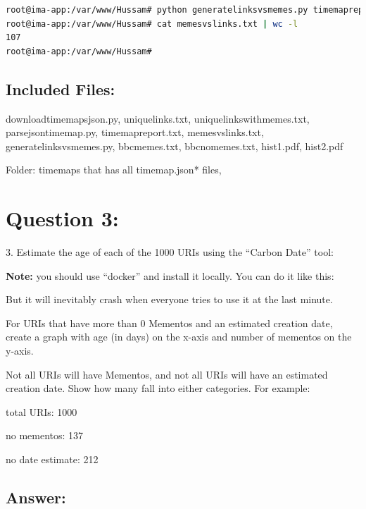 \documentclass[a4paper, 11pt]{article}
\begin{document}


\begin{lstlisting}[language=bash, breakatwhitespace=〈false), label=Command, caption=Running generatelinksvsmemes.py]
root@ima-app:/var/www/Hussam# python generatelinksvsmemes.py timemapreport.txt memesvslinks.txt
root@ima-app:/var/www/Hussam# cat memesvslinks.txt | wc -l
107
root@ima-app:/var/www/Hussam#
\end{lstlisting} 


\subsection*{Included Files:}
downloadtimemapsjson.py, uniquelinks.txt, uniquelinkswithmemes.txt, parsejsontimemap.py, timemapreport.txt, memesvslinks.txt, generatelinksvsmemes.py, bbcmemes.txt, bbcnomemes.txt, hist1.pdf, hist2.pdf 

\noindent 
Folder: timemaps that has all timemap.json* files,  

\section*{Question 3:}
3.  Estimate the age of each of the 1000 URIs using the ``Carbon
Date'' tool:

\textbf{Note:} 
you should use ``docker'' and install it locally.  You can do it like this:

But it will inevitably crash when everyone tries to use it at the
last minute.

For URIs that have more than 0 Mementos and an estimated creation date,
create a graph with age (in days) on the x-axis and number of
mementos on the y-axis.

Not all URIs will have Mementos, and not all URIs will have an
estimated creation date.  Show how many fall into either categories.
For example:

total URIs:	        1000

no mementos:	 	 137  

no date estimate:	 212
     
\subsection*{Answer:} 
\end{document}
